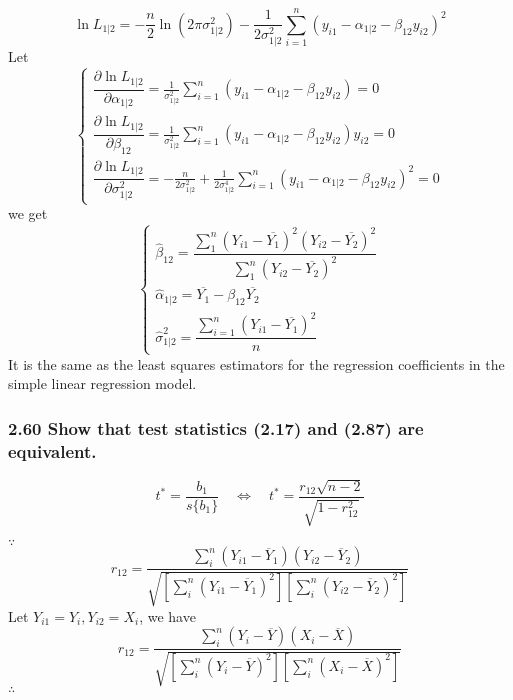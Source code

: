 \documentclass[]{article}
\begin{document}
\[\ln L_{1|2}=-\frac{n}{2}\ln(2\pi\sigma^2_{1|2})-\frac{1}{2\sigma_{1|2}^2}\sum\limits_{i=1}^n(y_{i1}-\alpha_{1|2}-\beta_{12}y_{i2})^2\]
Let \[\begin{cases}
\dfrac{\partial\ln L_{1|2}}{\partial \alpha_{1|2}}=\frac{1}{\sigma_{1|2}^2}\sum\limits_{i=1}^n(y_{i1}-\alpha_{1|2}-\beta_{12}y_{i2})=0\\
\dfrac{\partial\ln L_{1|2}}{\partial\beta_{12}}=\frac{1}{\sigma_{1|2}^2}\sum\limits_{i=1}^n(y_{i1}-\alpha_{1|2}-\beta_{12}y_{i2})y_{i2}=0\\
\dfrac{\partial\ln L_{1|2}}{\partial\sigma^2_{1|2}}=-\frac{n}{2\sigma_{1|2}^2}+\frac{1}{2\sigma_{1|2}^4}\sum\limits_{i=1}^n(y_{i1}-\alpha_{1|2}-\beta_{12}y_{i2})^2=0
\end{cases}\] we get \[\begin{cases}
\hat{\beta}_{12}=\dfrac{\sum\limits_1^n(Y_{i1}-\overline{Y_1})^2(Y_{i2}-\overline{Y_2})^2}{\sum\limits_1^n(Y_{i2}-\overline{Y_2})^2}\\
\hat{\alpha}_{1|2}=\overline{Y_1}-\beta_{12}\overline{Y_2}\\
\hat{\sigma}_{1|2}^2=\dfrac{\sum\limits_{i=1}^n(Y_{i1}-\overline{Y_1})^2}{n}
\end{cases}\] It is the same as the least squares estimators for the
regression coefficients in the simple linear regression model.

\subsubsection{2.60 Show that test statistics (2.17) and (2.87) are
equivalent.}\label{show-that-test-statistics-2.17-and-2.87-are-equivalent.}

\[t^*=\dfrac{b_1}{s\{b_1\}}\quad\Longleftrightarrow\quad t^*=\dfrac{r_{12}\sqrt{n-2}}{\sqrt{1-r_{12}^2}}\]

\(\because\quad\)
\[r_{12}=\dfrac{\sum\limits_{i}^n(Y_{i1}-\overline{Y}_1)(Y_{i2}-\overline{Y}_2)}{\sqrt{\left[\sum\limits_{i}^n(Y_{i1}-\overline{Y}_1)^2\right]\left[\sum\limits_{i}^n(Y_{i2}-\overline{Y}_2)^2\right]}}\]
Let \(Y_{i1}=Y_i,Y_{i2}=X_i\), we have
\[r_{12}=\dfrac{\sum\limits_{i}^n(Y_{i}-\overline{Y})(X_{i}-\overline{X})}{\sqrt{\left[\sum\limits_{i}^n(Y_{i}-\overline{Y})^2\right]\left[\sum\limits_{i}^n(X_{i}-\overline{X})^2\right]}}\]
\(\therefore\quad\)
\end{document}
